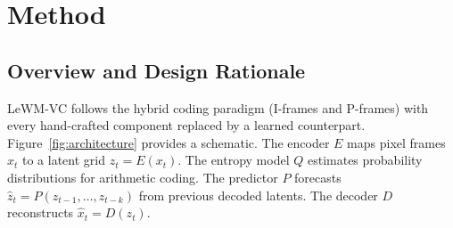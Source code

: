 \documentclass{article}
\begin{document}
\begin{table}[ht]
\centering
\caption{Comparison of codec paradigms across dimensions relevant to machine-oriented compression. LeWM-VC is the only approach that simultaneously eliminates hand-crafted motion vectors, natively preserves semantics, provides anomaly signaling, and is demonstrated on a reproducible evaluation framework.}
\label{tab:paradigm_compare}
\vspace{4pt}
\small
{}
\end{table}

\section{Method}
\label{sec:method}

\subsection{Overview and Design Rationale}

LeWM-VC follows the hybrid coding paradigm (I-frames and P-frames) with every hand-crafted component replaced by a learned counterpart. Figure~\ref{fig:architecture} provides a schematic. The encoder $E$ maps pixel frames $x_t$ to a latent grid $z_t = E(x_t)$. The entropy model $Q$ estimates probability distributions for arithmetic coding. The predictor $P$ forecasts $\hat{z}_t = P(z_{t-1}, \dots, z_{t-k})$ from previous decoded latents. The decoder $D$ reconstructs $\hat{x}_t = D(z_t)$.
\end{document}
